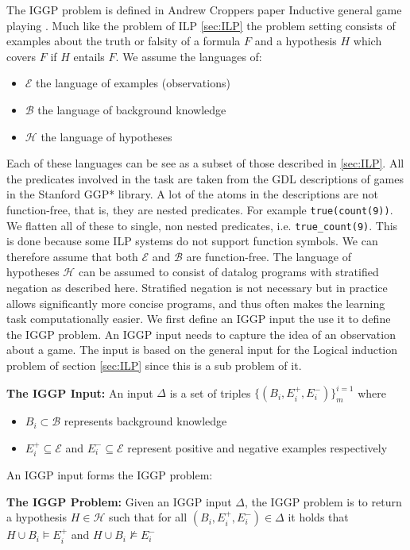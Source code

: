 \documentclass[a4paper,12pt]{report}
\begin{document}
The IGGP problem is defined in Andrew Croppers paper Inductive general game playing \cite{Cropper/IGGP}. Much like the problem of ILP \ref{sec:ILP} the problem setting consists of examples about the truth or falsity of a formula $F$ and a hypothesis $H$ which covers $F$ if $H$ entails $F$. We assume the languages of:
\begin{itemize}
\item $\mathscr{E}$ the language of examples (observations)
\item $\mathscr{B}$ the language of background knowledge
\item $\mathscr{H}$ the language of hypotheses
\end{itemize} Each of these languages can be see as a subset of those described in \ref{sec:ILP}. All the predicates involved in the task are taken from the GDL descriptions of games in the Stanford GGP* library. A lot of the atoms in the descriptions are not function-free, that is, they are nested predicates. For example \texttt{true(count(9))}. We flatten all of these to single, non nested predicates, i.e. \texttt{true_count(9)}. This is done because some ILP systems do not support function symbols. We can therefore assume that both $\mathscr{E}$ and $\mathscr{B}$ are function-free. The language of hypotheses $\mathscr{H}$ can be assumed to consist of datalog programs with stratified negation as described here\cite{Kenneth}. Stratified negation is not necessary but in practice allows significantly more concise programs, and thus often makes the learning task computationally easier. We first define an IGGP input the use it to define the IGGP problem. An IGGP input needs to capture the idea of an observation about a game. The input is based on the general input for the Logical induction problem of section \ref{sec:ILP} since this is a sub problem of it. 

\textbf{The IGGP Input:} An input $\Delta$ is a set of triples $\{(B_i,E_i^+,E_i^-)\}_m^{i=1}$ where
\begin{itemize}
\item $B_i \subset \mathcal{B}$ represents background knowledge
\item $E_i^+ \subseteq \mathscr{E}$ and $E_i^- \subseteq \mathscr{E}$ represent positive and negative examples respectively
\end{itemize}
An IGGP input forms the IGGP problem:

\textbf{The IGGP Problem:} Given an IGGP input $\Delta$, the IGGP problem is to return a hypothesis $H \in \mathscr{H}$ such that for all $(B_i,E_i^+,E_i^-) \in \Delta$ it holds that $H \cup B_i \vDash E_i^+$ and
$H \cup B_i \nvDash E_i^−$
\end{document}
